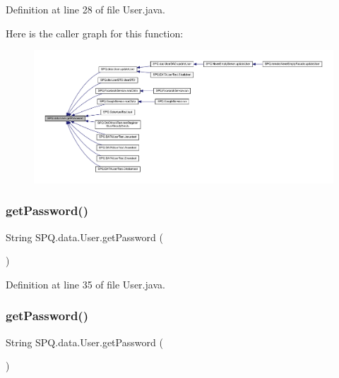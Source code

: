 Definition at line 28 of file User.\+java.

Here is the caller graph for this function\+:\nopagebreak
\begin{figure}[H]
\begin{center}
\leavevmode
\includegraphics[width=350pt]{class_s_p_q_1_1data_1_1_user_a688c1eadd21594d52967d87289e23ce2_icgraph}
\end{center}
\end{figure}
\mbox{\label{class_s_p_q_1_1data_1_1_user_a688c1eadd21594d52967d87289e23ce2}} 
\subsubsection{\texorpdfstring{get\+Password()}{getPassword()}\hspace{0.1cm}{\footnotesize\ttfamily [3/4]}}
{\footnotesize\ttfamily String S\+P\+Q.\+data.\+User.\+get\+Password (\begin{DoxyParamCaption}{ }\end{DoxyParamCaption})}



Definition at line 35 of file User.\+java.

\mbox{\label{class_s_p_q_1_1data_1_1_user_a688c1eadd21594d52967d87289e23ce2}} 
\subsubsection{\texorpdfstring{get\+Password()}{getPassword()}\hspace{0.1cm}{\footnotesize\ttfamily [4/4]}}
{\footnotesize\ttfamily String S\+P\+Q.\+data.\+User.\+get\+Password (\begin{DoxyParamCaption}{ }\end{DoxyParamCaption})}

